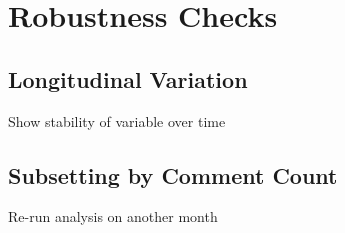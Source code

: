 \documentclass{article}
\begin{document}
\section{Robustness Checks}

\subsection{Longitudinal Variation}

Show stability of variable over time

\subsection{Subsetting by Comment Count}

Re-run analysis on another month
\end{document}
